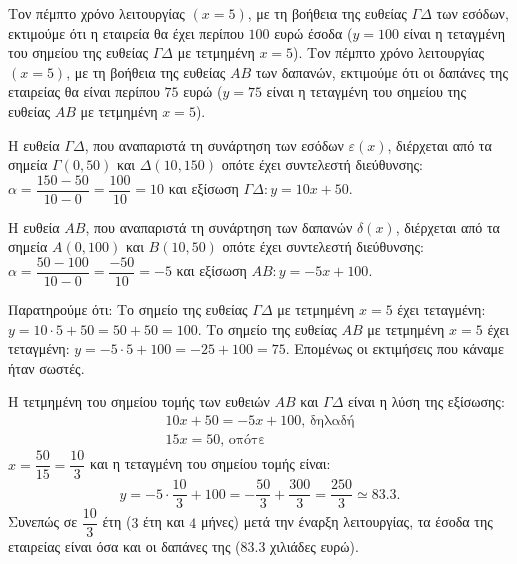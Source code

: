 
\begin{alist}
\item Τον πέμπτο χρόνο λειτουργίας $(x = 5)$, με τη βοήθεια της ευθείας $\Gamma\Delta$ των εσόδων,
εκτιμούμε ότι η εταιρεία θα έχει περίπου $100$ ευρώ έσοδα ($y = 100$ είναι η τεταγμένη του
σημείου της ευθείας $\Gamma\Delta$ με τετμημένη $x = 5$).
Τον πέμπτο χρόνο λειτουργίας $(x = 5)$, με τη βοήθεια της ευθείας $AB$ των δαπανών,
εκτιμούμε ότι οι δαπάνες της εταιρείας θα είναι περίπου $75$ ευρώ ($y = 75$ είναι η τεταγμένη
του σημείου της ευθείας $AB$ με τετμημένη $x = 5$).

\item 
\begin{rlist}
\item Η ευθεία $\Gamma\Delta$, που αναπαριστά τη συνάρτηση των εσόδων $\varepsilon(x)$, διέρχεται από τα
σημεία $\Gamma(0, 50)$ και $\Delta(10, 150)$ οπότε έχει συντελεστή διεύθυνσης:
$\alpha = \dfrac{150 - 50}{10 - 0} = \dfrac{100}{10} = 10$ και εξίσωση $\Gamma\Delta: y = 10x + 50$.

Η ευθεία $AB$, που αναπαριστά τη συνάρτηση των δαπανών $\delta(x)$, διέρχεται από τα
σημεία $A(0, 100)$ και $B(10, 50)$ οπότε έχει συντελεστή διεύθυνσης:
$\alpha = \dfrac{50 - 100}{10 - 0} = \dfrac{-50}{10} = -5$ και εξίσωση $AB: y = -5x + 100$.

Παρατηρούμε ότι: 
Το σημείο της ευθείας $\Gamma\Delta$ με τετμημένη $x = 5$ έχει τεταγμένη:
$y = 10 \cdot 5 + 50 = 50 + 50 = 100$.
Το σημείο της ευθείας $AB$ με τετμημένη $x = 5$ έχει τεταγμένη:
$y = -5 \cdot 5 + 100 = -25 + 100 = 75$.
Επομένως οι εκτιμήσεις που κάναμε ήταν σωστές.

\item Η τετμημένη του σημείου τομής των ευθειών $AB$ και $\Gamma\Delta$ είναι η λύση της εξίσωσης:
\begin{gather*}
10x + 50 = -5x + 100\text{, δηλαδή} \\
15x = 50\text{, οπότε}
\end{gather*}
$x = \dfrac{50}{15} = \dfrac{10}{3}$ και η τεταγμένη του σημείου τομής είναι: 
\[y = -5 \cdot \dfrac{10}{3} + 100 = -\dfrac{50}{3} + \dfrac{300}{3} = \dfrac{250}{3} \simeq 83.3.\]
Συνεπώς σε $\dfrac{10}{3}$ έτη ($3$ έτη και $4$ μήνες) μετά την έναρξη λειτουργίας, τα έσοδα της
εταιρείας είναι όσα και οι δαπάνες της ($83.3$ χιλιάδες ευρώ).
\end{rlist}
\end{alist}

